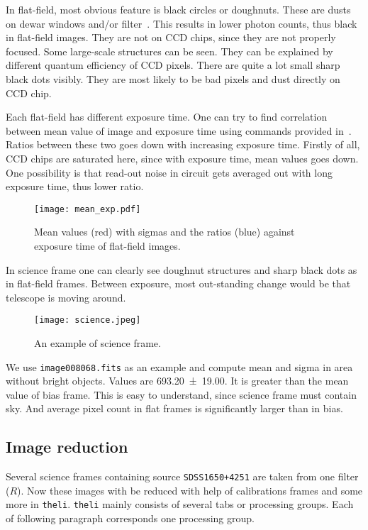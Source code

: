 In flat-field, most obvious feature is black circles or doughnuts. These are dusts on dewar windows and/or filter~\cite{manual}. This results in lower photon counts, thus black in flat-field images. They are not on CCD chips, since they are not properly focused. Some large-scale structures can be seen. They can be explained by different quantum efficiency of CCD pixels. There are quite a lot small sharp black dots visibly. They are most likely to be bad pixels and dust directly on CCD chip.

Each flat-field has different exposure time. One can try to find correlation between mean value of image and exposure time using commands provided in~\cite{manual}. Ratios between these two goes down with increasing exposure time. Firstly of all, CCD chips are saturated here, since with exposure time, mean values goes down. One possibility is that read-out noise in circuit gets averaged out with long exposure time, thus lower ratio. 
\begin{figure}[H]
   \centering
   \texttt{[image: mean\_exp.pdf]}
   \caption{Mean values (red) with sigmas and the ratios (blue) against exposure time of flat-field images.}%
\end{figure}

In science frame one can clearly see doughnut structures and sharp black dots as in flat-field frames. Between exposure, most out-standing change would be that telescope is moving around. 
\begin{figure}[H]
   \centering
   \texttt{[image: science.jpeg]}
   \caption{An example of science frame.}%
   \label{fig:science}
\end{figure}

We use \verb|image008068.fits| as an example and compute mean and sigma in area without bright objects. Values are \num{693.20 +- 19.00}. It is greater than the mean value of bias frame. This is easy to understand, since science frame must contain sky. And average pixel count in flat frames is significantly larger than in bias.

\subsection{Image reduction}
Several science frames containing source \verb|SDSS1650+4251|  are taken from one filter ($R$). Now these images with be reduced with help of calibrations frames and some more in \verb|theli|. \verb|theli| mainly consists of several tabs or processing groups. Each of following paragraph corresponds one processing group.

